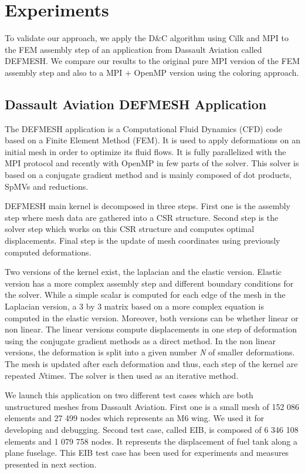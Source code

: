 \documentclass{IOS-Book-Article}
\begin{document}
\section{Experiments}
To validate our approach, we apply the D\&C algorithm using Cilk and MPI to the FEM assembly step of an application from Dassault Aviation called DEFMESH.
We compare our results to the original pure MPI version of the FEM assembly step and also to a MPI + OpenMP version using the coloring approach.

\subsection{Dassault Aviation DEFMESH Application}
The DEFMESH application is a Computational Fluid Dynamics (CFD) code based on a Finite Element Method (FEM).
It is used to apply deformations on an initial mesh in order to optimize its fluid flows.
It is fully parallelized with the MPI protocol and recently with OpenMP in few parts of the solver.
This solver is based on a conjugate gradient method and is mainly composed of dot products, SpMVs and reductions.

DEFMESH main kernel is decomposed in three steps.
First one is the assembly step where mesh data are gathered into a CSR structure.
Second step is the solver step which works on this CSR structure and computes optimal displacements.
Final step is the update of mesh coordinates using previously computed deformations.

Two versions of the kernel exist, the laplacian and the elastic version. Elastic version has a more complex assembly step and different boundary conditions for the solver.
While a simple scalar is computed for each edge of the mesh in the Laplacian version, a 3 by 3 matrix based on a more complex equation is computed in the elastic version.
Moreover, both versions can be whether linear or non linear.
The linear versions compute displacements in one step of deformation using the conjugate gradient methods as a direct method.
In the non linear versions, the deformation is split into a given number \emph{N} of smaller deformations.
The mesh is updated after each deformation and thus, each step of the kernel are repeated $N$times. The solver is then used as an iterative method.

We launch this application on two different test cases which are both unstructured meshes from Dassault Aviation.
First one is a small mesh of 152 086 elements and 27 499 nodes which represents an M6 wing. We used it for developing and debugging.
Second test case, called EIB, is composed of 6 346 108 elements and 1 079 758 nodes. It represents the displacement of fuel tank along a plane fuselage.
This EIB test case has been used for experiments and measures presented in next section.
\end{document}
